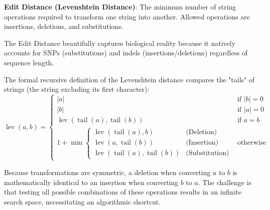 \documentclass[11pt,a4paper]{article}
\begin{document}
\begin{important}
\textbf{Edit Distance (Levenshtein Distance)}: The minimum number of string operations required to transform one string into another. Allowed operations are insertions, deletions, and substitutions.
\end{important}

The Edit Distance beautifully captures biological reality because it natively accounts for SNPs (substitutions) and indels (insertions/deletions) regardless of sequence length. 

The formal recursive definition of the Levenshtein distance compares the "tails" of strings (the string excluding its first character):
\begin{equation}
\operatorname{lev}(a,b) = \begin{cases}
  |a| & \text{if } |b| = 0 \\
  |b| & \text{if } |a| = 0 \\
  \operatorname{lev}(\operatorname{tail}(a), \operatorname{tail}(b)) & \text{if } a = b \\
  1 + \min \begin{cases}
    \operatorname{lev}(\operatorname{tail}(a), b) & \text{(Deletion)} \\
    \operatorname{lev}(a, \operatorname{tail}(b)) & \text{(Insertion)} \\
    \operatorname{lev}(\operatorname{tail}(a), \operatorname{tail}(b)) & \text{(Substitution)}
  \end{cases} & \text{otherwise}
\end{cases}
\end{equation}

Because transformations are symmetric, a deletion when converting \(a\) to \(b\) is mathematically identical to an insertion when converting \(b\) to \(a\). The challenge is that testing all possible combinations of these operations results in an infinite search space, necessitating an algorithmic shortcut.
\end{document}
